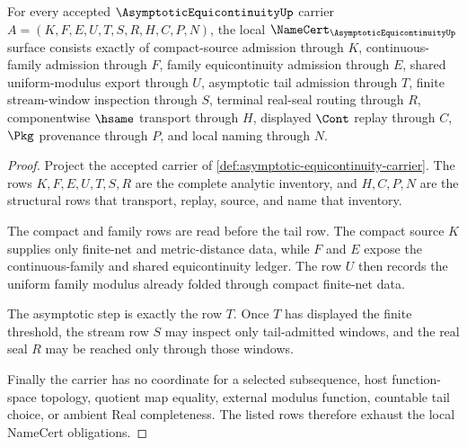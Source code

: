 \begin{theorem}
\label{thm:asymptotic-equicontinuity-namecert-obligations}
For every accepted $\AsymptoticEquicontinuityUp$ carrier $A=(K,F,E,U,T,S,R,H,C,P,N)$, the local $\NameCert_{\AsymptoticEquicontinuityUp}$ surface consists exactly of compact-source admission through $K$, continuous-family admission through $F$, family equicontinuity admission through $E$, shared uniform-modulus export through $U$, asymptotic tail admission through $T$, finite stream-window inspection through $S$, terminal real-seal routing through $R$, componentwise $\hsame$ transport through $H$, displayed $\Cont$ replay through $C$, $\Pkg$ provenance through $P$, and local naming through $N$.
\end{theorem}
\begin{proof}
Project the accepted carrier of \autoref{def:asymptotic-equicontinuity-carrier}. The rows $K,F,E,U,T,S,R$ are the complete analytic inventory, and $H,C,P,N$ are the structural rows that transport, replay, source, and name that inventory.

The compact and family rows are read before the tail row. The compact source $K$ supplies only finite-net and metric-distance data, while $F$ and $E$ expose the continuous-family and shared equicontinuity ledger. The row $U$ then records the uniform family modulus already folded through compact finite-net data.

The asymptotic step is exactly the row $T$. Once $T$ has displayed the finite threshold, the stream row $S$ may inspect only tail-admitted windows, and the real seal $R$ may be reached only through those windows.

Finally the carrier has no coordinate for a selected subsequence, host function-space topology, quotient map equality, external modulus function, countable tail choice, or ambient Real completeness. The listed rows therefore exhaust the local NameCert obligations.
\end{proof}

